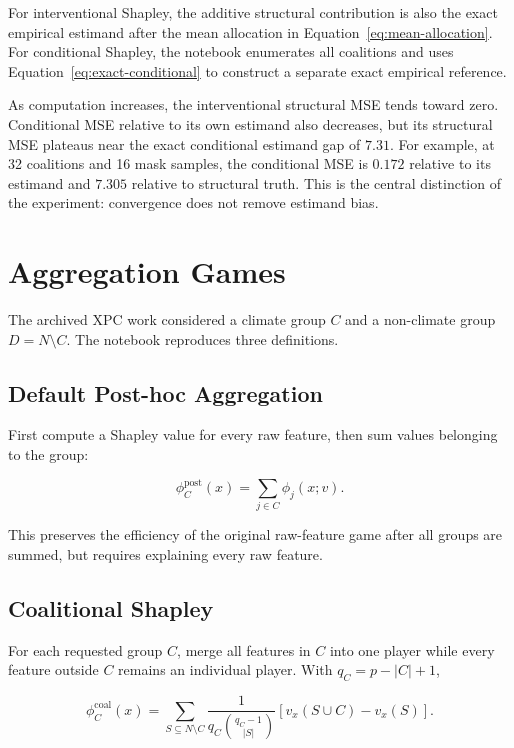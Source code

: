 \documentclass[11pt]{article}
\begin{document}
For interventional Shapley, the additive structural contribution is also the
exact empirical estimand after the mean allocation in
Equation~\eqref{eq:mean-allocation}.  For conditional Shapley, the notebook
enumerates all coalitions and uses Equation~\eqref{eq:exact-conditional} to
construct a separate exact empirical reference.

As computation increases, the interventional structural MSE tends toward zero.
Conditional MSE relative to its own estimand also decreases, but its structural
MSE plateaus near the exact conditional estimand gap of \(7.31\).  For example,
at 32 coalitions and 16 mask samples, the conditional MSE is \(0.172\) relative
to its estimand and \(7.305\) relative to structural truth.  This is the central
distinction of the experiment: convergence does not remove estimand bias.

\section{Aggregation Games}

The archived XPC work considered a climate group \(C\) and a non-climate group
\(D=N\setminus C\).  The notebook reproduces three definitions.

\subsection{Default Post-hoc Aggregation}

First compute a Shapley value for every raw feature, then sum values belonging
to the group:

\begin{equation}
\phi_C^{\mathrm{post}}(x)=\sum_{j\in C}\phi_j(x;v).
\end{equation}

This preserves the efficiency of the original raw-feature game after all
groups are summed, but requires explaining every raw feature.

\subsection{Coalitional Shapley}

For each requested group \(C\), merge all features in \(C\) into one player
while every feature outside \(C\) remains an individual player.  With
\(q_C=p-|C|+1\),

\begin{equation}
\phi_C^{\mathrm{coal}}(x)
=\sum_{S\subseteq N\setminus C}
\frac{1}{q_C\binom{q_C-1}{|S|}}
\left[v_x(S\cup C)-v_x(S)\right].
\label{eq:coalitional}
\end{equation}
\end{document}
